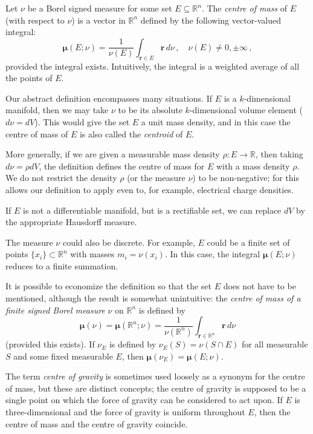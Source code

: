 \documentclass[12pt]{article}
\newcommand{\real}{\mathbb{R}}
\providecommand{\defnterm}[1]{\emph{#1}}
\newcommand{\vr}{\mathbf{r}}
\newcommand{\vmu}{\boldsymbol{\mu}}
\begin{document}
Let $\nu$ be a Borel signed measure for some set $E \subseteq \real^n$.
The \defnterm{centre of mass} of $E$
(with respect to $\nu$) is a vector in $\real^n$ defined by the following vector-valued integral:
\[
\vmu(E; \nu) = \frac{1}{\nu(E)} \int_{\vr \in E} \vr \, d\nu\,, \quad \nu(E) \neq 0, \pm \infty\,,
\]
provided the integral exists. Intuitively, the integral is a weighted average
of all the points of $E$.

Our abstract definition encompasses many situations.
If $E$ is a $k$-dimensional manifold, then we may take $\nu$ to be its 
absolute $k$-dimensional volume element ($d\nu = dV$).
This would give the set $E$ a unit mass density,
and in this case the centre of mass of $E$
is also called the \defnterm{centroid} of $E$.  

More generally, if we are given a measurable mass density $\rho\colon E \to \real$,
then taking $d\nu = \rho dV$, the definition defines the centre of mass for $E$
with a mass density $\rho$.
We do not restrict the density $\rho$ (or the measure $\nu$) to be non-negative;
for this allows our definition to apply even to, for example, electrical charge densities.

If $E$ is not a differentiable manifold, but is a rectifiable set, we can replace 
$dV$ by the appropriate Hausdorff measure.

The measure $\nu$ could also be discrete.  For example, $E$ could be a finite set of points $\{ x_i \} \subset \real^n$ with masses $m_i = \nu(x_i)$.  In this case, the integral $\vmu(E; \nu)$ 
reduces to a finite summation.

It is possible to economize the definition so that the set $E$ does not have to be mentioned,
although the result is somewhat unintuitive:
the \emph{centre of mass of a finite signed Borel measure} $\nu$ on $\real^n$
is defined by
\[
\vmu(\nu) = \vmu(\real^n; \nu) = \frac{1}{\nu(\real^n)} \int_{\vr \in \real^n} \vr \, d\nu
\]
(provided this exists).
If $\nu_E$ is defined by $\nu_E(S) = \nu(S \cap E)$ for all measurable $S$ and some fixed measurable $E$, then $\vmu(\nu_E) = \vmu(E ; \nu)$.

\medskip

The term \defnterm{centre of gravity} is sometimes
used loosely as a synonym for the centre of mass, but these are distinct concepts;
the centre of gravity is supposed to be a single point on which the force of gravity can
be considered to act upon. If $E$ is three-dimensional and the force of gravity is uniform throughout $E$, then the centre of mass and the centre of gravity coincide.
\end{document}

